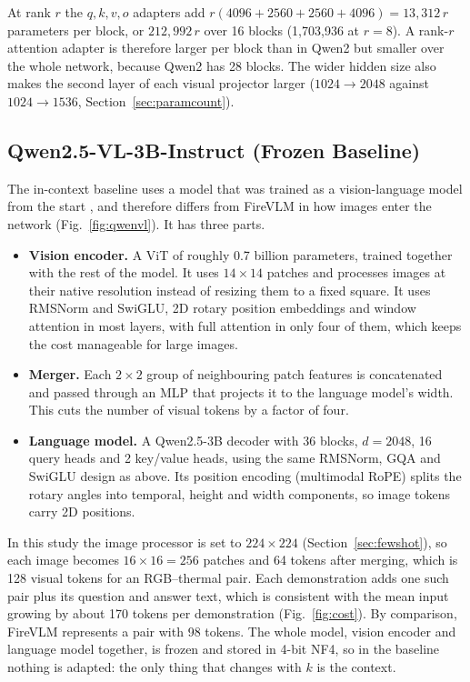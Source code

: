 \documentclass[12pt]{report}
\begin{document}
At rank $r$ the $q,k,v,o$ adapters add $r(4096+2560+2560+4096)=13{,}312\,r$ parameters per block, or $212{,}992\,r$ over 16 blocks (1,703,936 at $r=8$). A rank-$r$ attention adapter is therefore larger per block than in Qwen2 but smaller over the whole network, because Qwen2 has 28 blocks. The wider hidden size also makes the second layer of each visual projector larger ($1024\to2048$ against $1024\to1536$, Section~\ref{sec:paramcount}).

\subsection{Qwen2.5-VL-3B-Instruct (Frozen Baseline)}
\label{sec:qwenvlarch}
The in-context baseline uses a model that was trained as a vision-language model from the start \cite{bai2025}, and therefore differs from FireVLM in how images enter the network (Fig.~\ref{fig:qwenvl}). It has three parts.
\begin{itemize}[leftmargin=0.5in, itemsep=2pt]
  \item \textbf{Vision encoder.} A ViT of roughly 0.7 billion parameters, trained together with the rest of the model. It uses $14\times14$ patches and processes images at their native resolution instead of resizing them to a fixed square. It uses RMSNorm and SwiGLU, 2D rotary position embeddings and window attention in most layers, with full attention in only four of them, which keeps the cost manageable for large images.
  \item \textbf{Merger.} Each $2\times2$ group of neighbouring patch features is concatenated and passed through an MLP that projects it to the language model's width. This cuts the number of visual tokens by a factor of four.
  \item \textbf{Language model.} A Qwen2.5-3B decoder with 36 blocks, $d=2048$, 16 query heads and 2 key/value heads, using the same RMSNorm, GQA and SwiGLU design as above. Its position encoding (multimodal RoPE) splits the rotary angles into temporal, height and width components, so image tokens carry 2D positions.
\end{itemize}
In this study the image processor is set to $224\times224$ (Section~\ref{sec:fewshot}), so each image becomes $16\times16=256$ patches and 64 tokens after merging, which is 128 visual tokens for an RGB--thermal pair. Each demonstration adds one such pair plus its question and answer text, which is consistent with the mean input growing by about 170 tokens per demonstration (Fig.~\ref{fig:cost}). By comparison, FireVLM represents a pair with 98 tokens. The whole model, vision encoder and language model together, is frozen and stored in 4-bit NF4, so in the baseline nothing is adapted: the only thing that changes with $k$ is the context.
\end{document}
